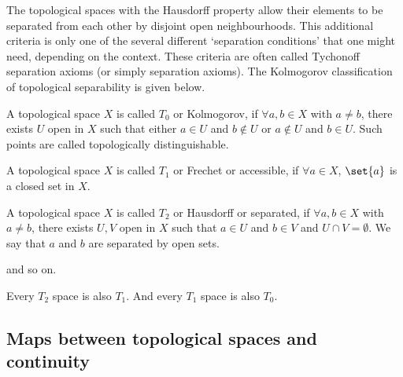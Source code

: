 The topological spaces with the Hausdorff property allow their elements to be separated from each other by disjoint open neighbourhoods. This additional criteria is only one of the several different `separation conditions' that one might need, depending on the context. These criteria are often called Tychonoff separation axioms (or simply separation axioms). The Kolmogorov classification of topological separability is given below.
\begin{ndfn}[$T_{0}$ spaces]
  A topological space $X$ is called $T_0$ or Kolmogorov, if $\forall a, b \in X$ with $a \neq b$, there exists $U$ open in $X$ such that either $a \in U$ and $b \notin U$ or $a \notin U$ and $b \in U$. Such points are called topologically distinguishable.
\end{ndfn}

\begin{ndfn}[$T_{1}$ spaces]
  A topological space $X$ is called $T_1$ or Frechet or accessible, if $\forall a \in X$, $\set{a}$ is a closed set in $X$.
\end{ndfn}

\begin{ndfn}[$T_{2}$ spaces]
  A topological space $X$ is called $T_2$ or Hausdorff or separated, if $\forall a, b \in X$ with $a \neq b$, there exists $U, V$ open in $X$ such that $a \in U$ and $b \in V$ and $U \cap V = \emptyset$. We say that $a$ and $b$ are separated by open sets.
\end{ndfn}
and so on.

\begin{nlemma}
  Every $T_2$ space is also $T_1$. And every $T_1$ space is also $T_0$.
\end{nlemma}

\subsection{Maps between topological spaces and continuity}


